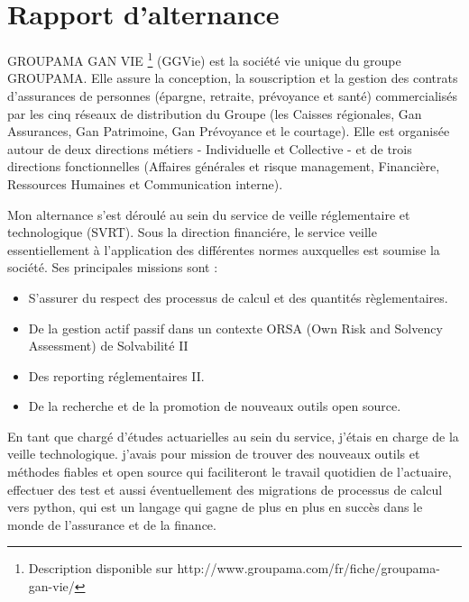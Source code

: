 \part{Rapport d'alternance}
\label{prt:missions} %

GROUPAMA GAN VIE \footnote{ Description disponible sur http://www.groupama.com/fr/fiche/groupama-gan-vie/} (GGVie) est la société vie unique du groupe GROUPAMA. Elle assure la conception, la souscription et la gestion des contrats d'assurances de personnes (épargne, retraite, prévoyance et santé) commercialisés par les cinq réseaux de distribution du Groupe (les Caisses régionales, Gan Assurances, Gan Patrimoine, Gan Prévoyance et le courtage). Elle est organisée autour de deux directions métiers - Individuelle et Collective - et de trois directions fonctionnelles (Affaires générales et risque management, Financière, Ressources Humaines et Communication interne).

Mon alternance s'est déroulé au sein du service de veille réglementaire et technologique (SVRT). Sous la direction financiére, le service veille essentiellement à l'application des différentes normes auxquelles est soumise la société. Ses principales missions sont :
\begin{itemize}
\item S'assurer du respect des processus de calcul et des quantités règlementaires.
\item De la gestion actif passif dans un contexte ORSA (Own Risk and Solvency Assessment) de Solvabilité \textsc{II}
\item Des reporting réglementaires \textsc{II}.
\item De la recherche et de la promotion de nouveaux outils open source.
\end{itemize}

En tant que chargé d'études actuarielles au sein du service, j'étais en charge de la veille technologique. j'avais pour mission de trouver des nouveaux outils et méthodes fiables et open source qui faciliteront le travail quotidien de l'actuaire, effectuer des test et aussi éventuellement des migrations de processus de calcul vers python, qui est un langage qui gagne de plus en plus en succès dans le monde de l'assurance et de la finance.


